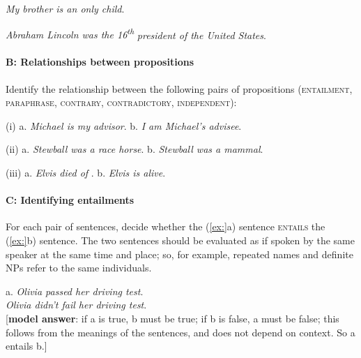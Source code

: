 \ex \textit{My brother is an only child}.

\ex \textit{Abraham Lincoln was the 16\textsuperscript{th}} \textit{president of the United States}.
                       \z
\z
\paragraph{B: Relationships between propositions}

Identify the relationship between the following pairs of propositions (\textsc{entailment, paraphrase, contrary,} \textsc{contradictory,} \textsc{independent}):

\begin{stylepoints}
(i)  a. \textit{Michael is my advisor}.  b. \textit{I am Michael’s advisee}.
\end{stylepoints}

\begin{stylepoints}
(ii)  a. \textit{Stewball was a race horse}.  b. \textit{Stewball was a mammal}.
\end{stylepoints}

\begin{stylepoints}
(iii)  a. \textit{Elvis died of} .  b. \textit{Elvis is alive}.
\end{stylepoints}

\paragraph{C: Identifying entailments}

For each pair of sentences, decide whether the (\ref{ex:}a) sentence \textsc{entails} the (\ref{ex:}b) sentence. The two sentences should be evaluated as if spoken by the same speaker at the same time and place; so, for example, repeated names and definite NPs refer to the same individuals.

\begin{stylepoints}
\ea%
    \label{ex:key:1}




          a. \textit{Olivia passed her driving test}.\\
\ex \textit{Olivia didn’t fail her driving test}.\\
{}[\textbf{model answer}: if a is true, b must be true; if b is false, a must be false; this follows from the meanings of the sentences, and does not depend on context. So a entails b.]
    \z
\end{stylepoints}

